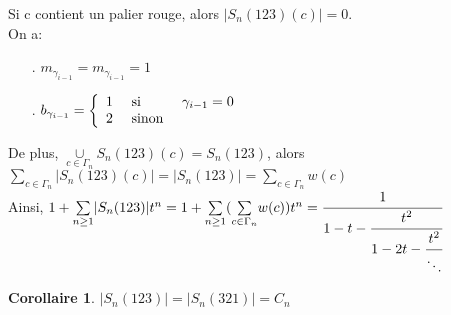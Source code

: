 \documentclass[12pt,a4paper]{extreport}
\newtheorem{corollaire}{Corollaire}[chapter]
\begin{document}
		Si c contient  un palier rouge, alors $|S_{n}(123)(c)|=0$.\\
		On a:
		\begin{itemize}
			\item[.] $m_{\gamma_{i-1}} = m_{\gamma_{i-1}} = 1 $
			\item[.] 
			$
			b_{\gamma_{i-1}} = \left\{\begin{array} {l l l}
				1 &\text{ si }& \gamma_{i-1} = 0\\
				2 &\text{ sinon }&
				\end{array} \right.
			$
		\end{itemize}
		De plus, $\underset{c\in \Gamma_{n}}{\cup}S_{n}(123)(c) = S_{n}(123) $, alors \\
		$\underset{c\in \Gamma_{n}}{\sum}|S_{n}(123)(c)| = |S_{n}(123)| = \underset{c\in \Gamma_{n}}{\sum}w(c) $\\
		Ainsi, $1 + \underset{n \geq 1}{\sum}|S_{n}(123)|t^n = 1 + \underset{n \geq 1}{\sum}(\underset{c\in \Gamma_{n}}{\sum}w(c))t^n = \cfrac{1}{1-t-\cfrac{t^2}{1-2t-\cfrac{t^2}{\ddots}}}$

	\begin{corollaire}
		$|S_{n}(123)|=|S_{n}(321)|=C_{n}$
	\end{corollaire}
\end{document}
